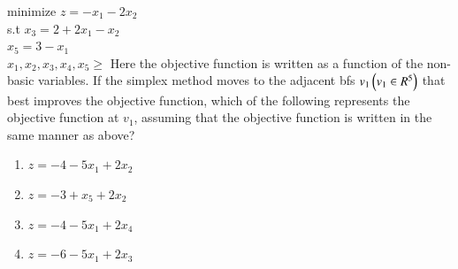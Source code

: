 \documentclass[journal]{IEEEtran}
\begin{document}
\begin{enumerate}
minimize $z=-x_{1}-2x_{2}$\\
s.t      $x_{3}=2+2x_{1}-x_{2}$\\
         $x_{5}=3-x_{1}$\\
         $x_{1},x_{2},x_{3},x_{4},x_{5} \geq$
Here the objective function is written as a function of the non-basic variables. If the
simplex method moves to the adjacent bfs $v_{1} \left(v_{1} \in R^{5}\right)$ that best improves the
objective function, which of the following represents the objective function at $v_{1}$,
assuming that the objective function is written in the same manner as above?\\
\begin{enumerate}
    \item$z=-4-5x_{1}+2x_{2}$\\
    \item$z=-3+x_{5}+2x_{2}$\\
    \item$z=-4-5x_{1}+2x_{4}$\\
    \item$z=-6-5x_{1}+2x_{3}$\\
\end{enumerate}
 




\end{enumerate}
\end{document}
